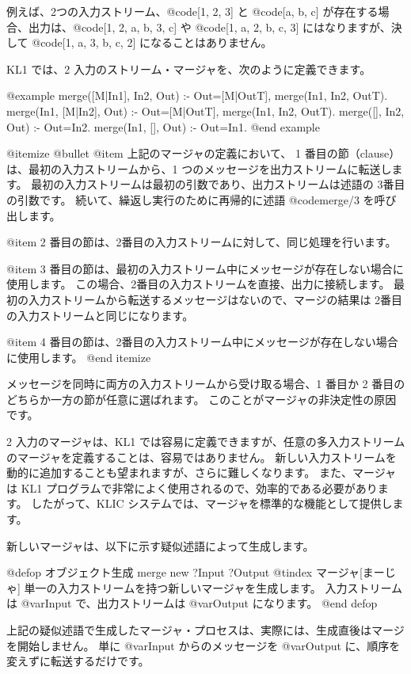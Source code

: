 {{例えば、2つの入力ストリーム、@code{[1, 2, 3]} と @code{[a, b, c]} が存在する場合、出力は、@code{[1, 2, a, b, 3, c]} や @code{[1, a, 2, b, c, 3]} にはなりますが、決して @code{[1, a, 3, b, c, 2]} になることはありません。

KL1 では、2 入力のストリーム・マージャを、次のように定義できます。

@example
merge([M|In1], In2, Out) :- Out=[M|OutT],  merge(In1, In2, OutT).
merge(In1, [M|In2], Out) :- Out=[M|OutT],  merge(In1, In2, OutT).
merge([], In2, Out) :- Out=In2.
merge(In1, [], Out) :- Out=In1.
@end example

@itemize @bullet
@item
上記のマージャの定義において、
 1 番目の節（clause）は、最初の入力ストリームから、1 つのメッセージを出力ストリームに転送します。
最初の入力ストリームは最初の引数であり、出力ストリームは述語の 3番目の引数です。
続いて、繰返し実行のために再帰的に述語 @code{merge/3} を呼び出します。

@item 
2 番目の節は、2番目の入力ストリームに対して、同じ処理を行います。

@item 
3 番目の節は、最初の入力ストリーム中にメッセージが存在しない場合に使用します。
この場合、2番目の入力ストリームを直接、出力に接続します。
最初の入力ストリームから転送するメッセージはないので、マージの結果は 2番目の入力ストリームと同じになります。

@item 
4 番目の節は、2番目の入力ストリーム中にメッセージが存在しない場合に使用します。
@end itemize

メッセージを同時に両方の入力ストリームから受け取る場合、1 番目か 2 番目のどちらか一方の節が任意に選ばれます。
このことがマージャの非決定性の原因です。

2 入力のマージャは、KL1 では容易に定義できますが、任意の多入力ストリームのマージャを定義することは、容易ではありません。
新しい入力ストリームを動的に追加することも望まれますが、さらに難しくなります。
また、マージャは KL1 プログラムで非常によく使用されるので、効率的である必要があります。
したがって、KLIC システムでは、マージャを標準的な機能として提供します。

新しいマージャは、以下に示す疑似述語によって生成します。

@defop {オブジェクト生成} {merge} new ?Input ?Output
@tindex マージャ[まーじゃ]
単一の入力ストリームを持つ新しいマージャを生成します。
入力ストリームは @var{Input} で、出力ストリームは @var{Output} になります。
@end defop

上記の疑似述語で生成したマージャ・プロセスは、実際には、生成直後はマージを開始しません。
単に @var{Input} からのメッセージを @var{Output} に、順序を変えずに転送するだけです。

}}
